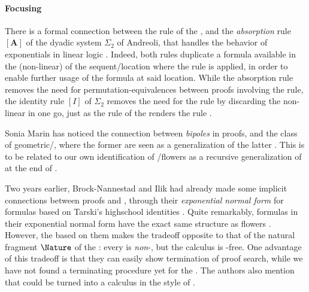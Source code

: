 \begin{scope}
\paragraph{Focusing}

There is a formal connection between the  rule of the , and the \emph{absorption} rule $[\mathbf{A}]$ of the dyadic system
$\Sigma_2$ of Andreoli, that handles the  behavior of exponentials in
linear logic . Indeed, both rules duplicate a formula
available in the (non-linear)  of the sequent/location where the rule is
applied, in order to enable further usage of the formula at said location. While
the absorption rule removes the need for permutation-equivalences between proofs
involving the \emph{} rule, the identity rule $[I]$ of $\Sigma_2$
removes the need for the \emph{} rule by discarding the non-linear
 in one go, just as the  rule of the  renders
the  rule .

Sonia Marin has noticed the connection between \emph{bipoles} in 
proofs, and the class of geometric/, where the former are seen
as a generalization of the latter . This is to be
related to our own identification of /flowers as a recursive
generalization of  at the end of .

\AP
Two years earlier, Brock-Nannestad and Ilik had already made some implicit
connections between  proofs and , through their
\emph{exponential normal form} for  formulas based on Tarski's
highschool identities . Quite
remarkably,  formulas in their exponential normal form have the exact
same structure as flowers
\cite[Definition~4.2]{brock-nannestad_intuitionistic_2019}. However, the   based on them makes the tradeoff opposite to that of the
natural fragment $\Nature$ of the : every  is
\emph{non}-, but the calculus is -free. One advantage of
this tradeoff is that they can easily show termination of proof search, while we
have not found a terminating procedure yet for the . The authors
also mention that  could be turned into a  calculus in the
style of .


\end{scope}
